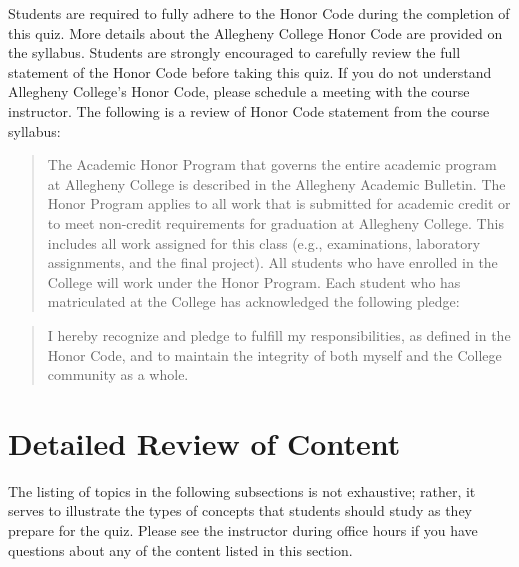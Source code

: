 \documentclass[11pt]{article}
\begin{document}

Students are required to fully adhere to the Honor Code during the completion of
this quiz. More details about the Allegheny College Honor Code are provided on
the syllabus. Students are strongly encouraged to carefully review the full
statement of the Honor Code before taking this quiz. If you do not understand
Allegheny College's Honor Code, please schedule a meeting with the course
instructor. The following is a review of Honor Code statement from the course
syllabus:

\vspace*{-.05in}

\begin{quote}
The Academic Honor Program that governs the entire academic program at
Allegheny College is described in the Allegheny Academic Bulletin. The Honor
Program applies to all work that is submitted for academic credit or to meet
non-credit requirements for graduation at Allegheny College. This includes all
work assigned for this class (e.g., examinations, laboratory assignments, and
the final project). All students who have enrolled in the College will work
under the Honor Program.  Each student who has matriculated at the College has
acknowledged the following pledge:
\end{quote}

\vspace*{-.1in}

\begin{quote}
  I hereby recognize and pledge to fulfill my responsibilities, as defined in the Honor Code, and to maintain the
  integrity of both myself and the College community as a whole.
\end{quote}

\section*{Detailed Review of Content}

The listing of topics in the following subsections is not exhaustive; rather, it
serves to illustrate the types of concepts that students should study as they
prepare for the quiz. Please see the instructor during office hours if you have
questions about any of the content listed in this section.

\vspace*{-.1in}
\end{document}
